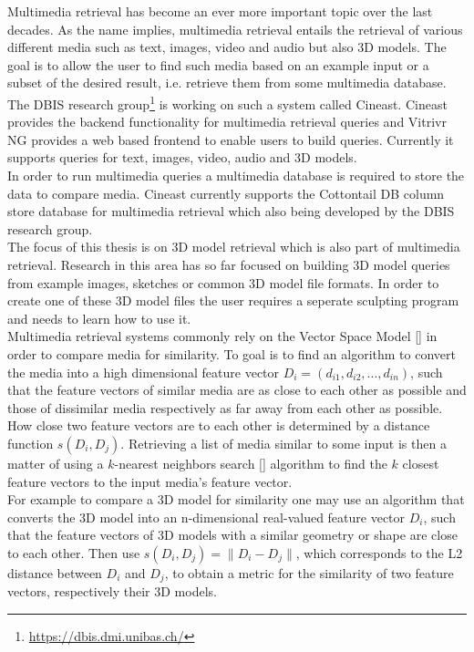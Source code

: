 Multimedia retrieval has become an ever more important topic over the last decades. As the name implies, multimedia retrieval entails the retrieval of various different media such as text, images, video and audio but also
3D models. The goal is to allow the user to find such media based on an example input or a subset of the desired result, i.e. retrieve them from some multimedia database.\\
The DBIS research group\footnote{\url{https://dbis.dmi.unibas.ch/}} is working on such a system called Cineast. Cineast provides the backend functionality for multimedia retrieval queries and Vitrivr NG provides a web
based frontend to enable users to build queries. Currently it supports queries for text, images, video, audio and 3D models.\\
In order to run multimedia queries a multimedia database is required to store the data to compare media. Cineast currently supports the Cottontail DB column store database for multimedia retrieval which also being developed by the DBIS research group.\\
The focus of this thesis is on 3D model retrieval which is also part of multimedia retrieval. Research in this area has so far focused on building 3D model queries from example images, sketches or common 3D model file formats.
In order to create one of these 3D model files the user requires a seperate sculpting program and needs to learn how to use it.\\
Multimedia retrieval systems commonly rely on the Vector Space Model [] in order to compare media for similarity. To goal is to find an algorithm to convert the media into a high dimensional feature vector $D_i = (d_{i1}, d_{i2}, ..., d_{in})$, such that the feature vectors of similar media are as close to each other as possible and those of dissimilar media respectively as far away from each other as possible. How close two feature vectors are to each other is determined by a distance function $s(D_i, D_j)$. Retrieving a list of media similar to some input is then a matter of using a $k$-nearest neighbors search [] algorithm to find the $k$ closest feature vectors to the input media's feature vector.\\
For example to compare a 3D model for similarity one may use an algorithm that converts the 3D model into an n-dimensional real-valued feature vector $D_i$, such that the feature vectors of 3D models with a similar geometry or shape are close to each other. Then use $s(D_i, D_j) = \lVert D_i - D_j \rVert$, which corresponds to the L2 distance between $D_i$ and $D_j$, to obtain a metric for the similarity of two feature vectors, respectively their 3D models.

